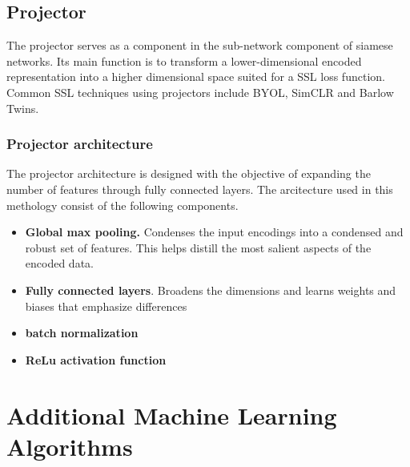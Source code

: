 
\subsection{Projector}
The projector serves as a component in the sub-network component of siamese networks.
Its main function is to transform a lower-dimensional encoded representation into a higher dimensional space suited for a SSL loss function. Common SSL techniques using projectors 
include BYOL, SimCLR and Barlow Twins.


\subsubsection{Projector architecture}
The projector architecture is designed with the objective of expanding the number of features through fully connected layers. The arcitecture used in this methology consist of the following components.
\begin{itemize}
    \item \textbf{Global max pooling.} Condenses the input encodings into a condensed and robust set of features. This helps distill the most salient aspects of the encoded data.
    \item \textbf{Fully connected layers}. Broadens the dimensions and learns weights and biases that emphasize differences 
    \item \textbf{batch normalization}
    \item \textbf{ReLu activation function}
\end{itemize}


\section{Additional Machine Learning Algorithms}
